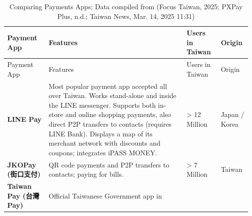 \documentclass[
  12pt,
  letterpaper,
  DIV=11,
  numbers=noendperiod]{scrartcl}
\begin{document}
\begin{longtable}[]{@{}
  >{\raggedright\arraybackslash}p{}
  >{\raggedright\arraybackslash}p{}
  >{\raggedright\arraybackslash}p{}
  >{\raggedright\arraybackslash}p{}@{}}
\caption[Comparing Payments Apps]{Comparing Payments Apps; Data compiled
from (Focus Taiwan, 2025; PXPay Plus, n.d.; Taiwan News, Mar. 14, 2025
11:31)}\tabularnewline
\toprule\noalign{}
\begin{minipage}[b]{\linewidth}\raggedright
Payment App
\end{minipage} & \begin{minipage}[b]{\linewidth}\raggedright
Features
\end{minipage} & \begin{minipage}[b]{\linewidth}\raggedright
Users in Taiwan
\end{minipage} & \begin{minipage}[b]{\linewidth}\raggedright
Origin
\end{minipage} \\
\midrule\noalign{}
\endfirsthead
\toprule\noalign{}
\begin{minipage}[b]{\linewidth}\raggedright
Payment App
\end{minipage} & \begin{minipage}[b]{\linewidth}\raggedright
Features
\end{minipage} & \begin{minipage}[b]{\linewidth}\raggedright
Users in Taiwan
\end{minipage} & \begin{minipage}[b]{\linewidth}\raggedright
Origin
\end{minipage} \\
\midrule\noalign{}
\endhead
\bottomrule\noalign{}
\endlastfoot
\textbf{LINE Pay} & Most popular payment app accepted all over Taiwan.
Works stand-alone and inside the LINE messenger. Supports both in-store
and online shopping payments, also direct P2P transfers to contacts
(requires LINE Bank). Displays a map of its merchant network with
discounts and coupons; integrates iPASS MONEY. & \textgreater{} 12
Million & Japan / Korea \\
\textbf{JKOPay (街口支付)} & QR code payments and P2P transfers to
contacts; paying for bills. & \textgreater{} 7 Million & Taiwan \\
\textbf{Taiwan Pay (台灣Pay)} & Official Taiwanese Government app in

\end{longtable}
\end{document}
